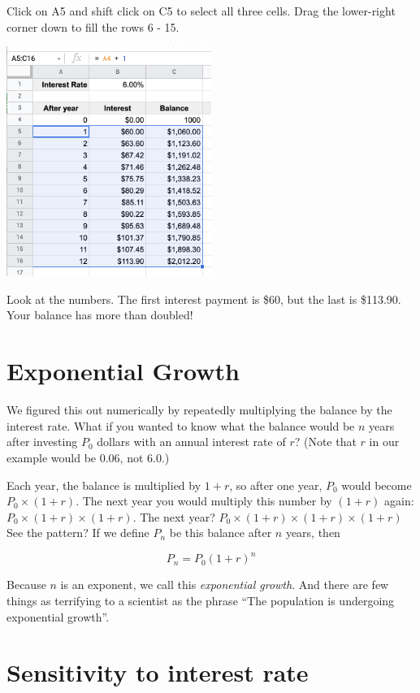 Click on A5 and shift click on C5 to select all three cells. Drag the
lower-right corner down to fill the rows 6 - 15.

\includegraphics[width=0.5\textwidth]{CopiedCellsInterest.png}

Look at the numbers.  The first interest payment is \$60, but the last
is \$113.90. Your balance has more than doubled!

\section{Exponential Growth}

We figured this out numerically by repeatedly multiplying the balance
by the interest rate.  What if you wanted to know what the balance
would be $n$ years after investing $P_0$ dollars with an annual interest
rate of $r$? (Note that $r$ in our example would be 0.06, not 6.0.)

Each year, the balance is multiplied by $1 + r$, so after one year,
$P_0$ would become $P_0 \times (1 + r)$.  The next year you would multiply
this number by $(1 + r)$ again: $P_0 \times (1 + r) \times (1 + r)$. The
next year? $P_0 \times (1 + r) \times (1 + r) \times (1 + r)$ See the
pattern? If we define $P_n$ be this balance after $n$ years, then

$$P_n = P_0 (1+r)^n$$

Because $n$ is an exponent, we call this \textit{exponential growth}.
And there are few things as terrifying to a scientist as
the phrase ``The population is undergoing exponential growth''.

\section{Sensitivity to interest rate}

